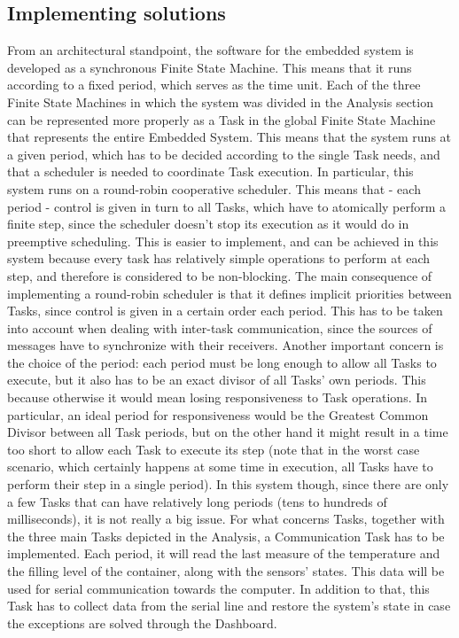 \documentclass[a4paper,12pt]{report}
\begin{document}
	\subsection{Implementing solutions}
	From an architectural standpoint, the software for the embedded system is developed as a synchronous Finite State Machine. This means that it runs according to a fixed period, which serves as the time unit. Each of the three Finite State Machines in which the system was divided in the Analysis section can be represented more properly as a Task in the global Finite State Machine that represents the entire Embedded System. This means that the system runs at a given period, which has to be decided according to the single Task needs, and that a scheduler is needed to coordinate Task execution.
	\newline In particular, this system runs on a round-robin cooperative scheduler. This means that - each period - control is given in turn to all Tasks, which have to atomically perform a finite step, since the scheduler doesn't stop its execution as it would do in preemptive scheduling. This is easier to implement, and can be achieved in this system because every task has relatively simple operations to perform at each step, and therefore is considered to be non-blocking. The main consequence of implementing a round-robin scheduler is that it defines implicit priorities between Tasks, since control is given in a certain order each period. This has to be taken into account when dealing with inter-task communication, since the sources of messages have to synchronize with their receivers. Another important concern is the choice of the period: each period must be long enough to allow all Tasks to execute, but it also has to be an exact divisor of all Tasks' own periods. This because otherwise it would mean losing responsiveness to Task operations. In particular, an ideal period for responsiveness would be the Greatest Common Divisor between all Task periods, but on the other hand it might result in a time too short to allow each Task to execute its step (note that in the worst case scenario, which certainly happens at some time in execution, all Tasks have to perform their step in a single period). In this system though, since there are only a few Tasks that can have relatively long periods (tens to hundreds of milliseconds), it is not really a big issue.
	\newline For what concerns Tasks, together with the three main Tasks depicted in the Analysis, a Communication Task has to be implemented. Each period, it will read the last measure of the temperature and the filling level of the container, along with the sensors' states. This data will be used for serial communication towards the computer. In addition to that, this Task has to collect data from the serial line and restore the system's state in case the exceptions are solved through the Dashboard.
\end{document}
